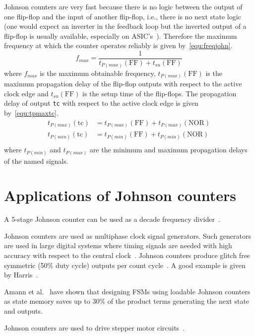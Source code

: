 \documentclass[12pt,a4paper,final,twoside,fleqn]{article}
\begin{document}
Johnson counters are very fast because there is no logic between the output of
one flip-flop and the input of another flip-flop, i.e., there is no next state
logic (one would expect an inverter in the feedback loop but the inverted
output of a flip-flop is usually available, especially on
ASIC's~\cite{weste2011}). Therefore the maximum frequency at which the counter
operates reliably is given by~\eqref{equ:freqjohn}.
%
\begin{equation}
\label{equ:freqjohn}
f_{max} = \dfrac{1}{t_{P(max)}(\mathrm{FF}) + t_{su}(\mathrm{FF})}
\end{equation}
%
where $f_{max}$ is the maximum obtainable frequency, $t_{P(max)}(\mathrm{FF})$
is the maximum propagation delay of the flip-flop outputs with respect to
the active clock edge and $t_{su}(\mathrm{FF})$ is the setup time of the
flip-flops. The propagation delay of output \lstinline|tc| with respect to
the active clock edge is given by~\eqref{equ:tpmaxtc}.
%
\begin{equation}
\begin{split}
\label{equ:tpmaxtc}
t_{P(max)}(\mathrm{tc}) &= t_{P(max)}(\mathrm{FF}) + t_{P(max)}(\mathrm{NOR}) \\
t_{P(min)}(\mathrm{tc}) &= t_{P(min)}(\mathrm{FF}) + t_{P(min)}(\mathrm{NOR}) \\
\end{split}
\end{equation}
%
where $t_{P(min)}$ and $t_{P(max)}$ are the minimum and maximum propagation
delays of the named signals.


\section{Applications of Johnson counters}
A 5-stage Johnson counter can be used as a decade frequency
divider~\cite{marston1996}.

Johnson counters are used as multiphase clock signal generators. Such
generators are used in large digital systems where timing signals are needed
with high accuracy with respect to the central clock~\cite{thijssen2000}.
Johnson counters produce glitch free symmetric (50\% duty cycle) outputs per
count cycle~\cite{cohen2002}. A good example is given by Harris~\cite{harris2002}.

Amann et al.~\cite{amann1988} have shown that designing FSMs using loadable
Johnson counters as state memory saves up to 30\% of the product terms
generating the next state and outputs.

Johnson counters are used to drive stepper motor
circuits~\cite{linfw1975,allaboutcircuits2015}.
\end{document}
